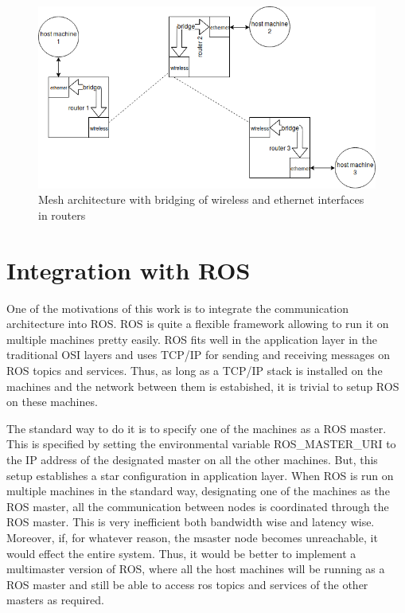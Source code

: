 \begin{figure}[h]
	\centering
	\includegraphics[scale=0.7]{Pictures/meshNetwork.png}
	\caption{Mesh architecture with bridging of wireless and ethernet interfaces in routers}
	\label{fig: meshNetwork}
\end{figure}

\section{Integration with ROS}
One of the motivations of this work is to integrate the communication architecture into ROS. ROS is quite a flexible framework allowing to run it on multiple machines pretty easily. ROS fits well in the application layer in the traditional OSI layers and uses TCP/IP for sending and receiving messages on ROS topics and services. Thus, as long as a TCP/IP stack is installed on the machines and the network between them is estabished, it is trivial to setup ROS on these machines.

The standard way to do it is to specify one of the machines as a ROS master. This is specified by setting the environmental variable ROS\_MASTER\_URI to the IP address of the designated master on all the other machines. But, this setup establishes a star configuration in application layer. When ROS is run on multiple machines in the standard way, designating one of the machines as the ROS master, all the communication between nodes is coordinated through the ROS master.  This is very inefficient both bandwidth wise and latency wise. Moreover, if, for whatever reason, the msaster node becomes unreachable, it would effect the entire system. Thus, it would be better to implement a multimaster version of ROS, where all the host machines will be running as a ROS master and still be able to access ros topics and services of the other masters as required.

